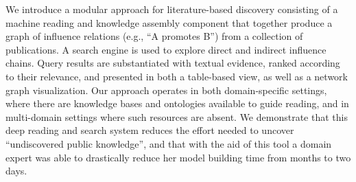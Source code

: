 We introduce a modular approach for literature-based discovery consisting of a machine reading and knowledge assembly component that together produce a graph of influence relations (e.g., ``A promotes B'') from a collection of publications.  A search engine is used to explore direct and indirect influence chains. Query results are substantiated with textual evidence, ranked according to their relevance, and presented in both a table-based view, as well as a network graph visualization.  Our approach operates in both domain-specific settings, where there are knowledge bases and ontologies available to guide reading, and in multi-domain settings where such resources are absent. We demonstrate that this deep reading and search system reduces the effort needed to uncover ``undiscovered public knowledge'', and that with the aid of this tool a domain expert was able to drastically reduce her model building time from months to two days.
